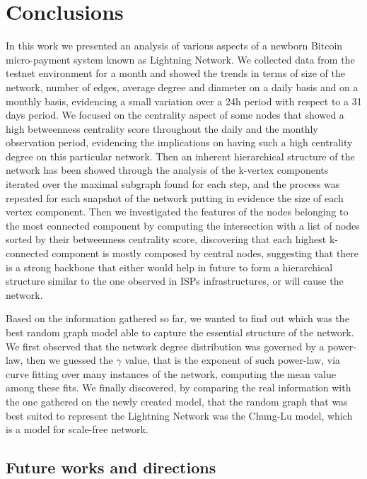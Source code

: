 
	\chapter{Conclusions}
	
	In this work we presented an analysis of various aspects of a newborn Bitcoin micro-payment system known as Lightning Network. We collected data from the testnet environment for a month and showed the trends in terms of size of the network, number of edges, average degree and diameter on a daily basis and on a monthly basis, evidencing a small variation over a 24h period with respect to a 31 days period. We focused on the centrality aspect of some nodes that showed a high betweenness centrality score throughout the daily and the monthly observation period, evidencing the implications on having such a high centrality degree on this particular network. Then an inherent hierarchical structure of the network has been showed through the analysis of the k-vertex components iterated over the maximal subgraph found for each step, and the process was repeated for each snapshot of the network putting in evidence the size of each vertex component. Then we investigated the features of the nodes belonging to the most connected component by computing the intersection with a list of nodes sorted by their betweenness centrality score, discovering that each highest k-connected component is mostly composed by central nodes, suggesting that there is a strong backbone that either would help in future to form a hierarchical structure similar to the one observed in ISPs infrastructures, or will cause the network.
	
	Based on the information gathered so far, we wanted to find out which was the best random graph model able to capture the essential structure of the network. We first observed that the network degree distribution was governed by a power-law, then we guessed the $\gamma$ value, that is the exponent of such power-law, via curve fitting over many instances of the network, computing the mean value among these fits. We finally discovered, by comparing the real information with the one gathered on the newly created model, that the random graph that was best suited to represent the Lightning Network was the Chung-Lu model, which is a model for scale-free network.
	
	\section{Future works and directions}
	
